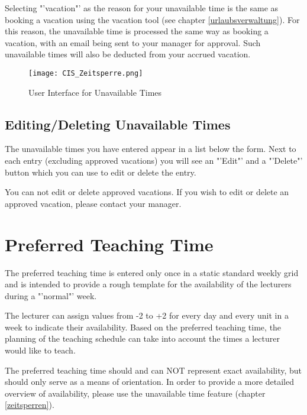 Selecting "'vacation"' as the reason for your unavailable time is the same as booking a vacation using the vacation tool (see chapter \ref{urlaubsverwaltung}).
For this reason, the unavailable time is processed the same way as booking a vacation, with an email being sent to your manager for approval. Such unavailable times will also be deducted from your accrued vacation.



\begin{figure}
	\centering
	\texttt{[image: CIS\_Zeitsperre.png]}
	\caption{User Interface for Unavailable Times}
	\label{eingabemaske_zeitsperren}
\end{figure}

\subsection{Editing/Deleting Unavailable Times}

The unavailable times you have entered appear in a list below the form.
Next to each entry (excluding approved vacations) you will see an "'Edit"' and a "'Delete"' button which you can use to edit or delete the entry.

You can not edit or delete approved vacations. If you wish to edit or delete an approved vacation, please contact your manager.

\section{Preferred Teaching Time}

The preferred teaching time is entered only once in a static standard weekly grid and is intended to provide a rough template for the availability of the lecturers during a "'normal"' week.

The lecturer can assign values from -2 to +2 for every day and every unit in a week to indicate their availability.
Based on the preferred teaching time, the planning of the teaching schedule can take into account the times a lecturer would like to teach.

The preferred teaching time should and can NOT represent exact availability, but should only serve as a means of orientation.
In order to provide a more detailed overview of availability, please use the unavailable time feature (chapter \ref{zeitsperren}).

